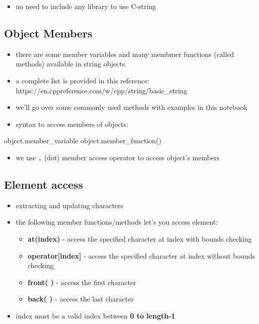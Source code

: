 \documentclass[11pt]{article}
\providecommand{\tightlist}{%
      \setlength{\itemsep}{0pt}\setlength{\parskip}{0pt}}
\newenvironment{Shaded}{}{}
\newcommand{\NormalTok}[1]{{#1}}
\newcommand{\OperatorTok}[1]{\textcolor[rgb]{0.40,0.40,0.40}{{#1}}}
\begin{document}
\begin{itemize}
\tightlist
\item
  no need to include any library to use C-string
\end{itemize}

    \hypertarget{object-members}{%
\subsection{Object Members}\label{object-members}}

\begin{itemize}
\tightlist
\item
  there are some member variables and many membmer functions (called
  methods) available in string objects
\item
  a complete list is provided in this reference:
  https://en.cppreference.com/w/cpp/string/basic\_string
\item
  we'll go over some commonly used methods with examples in this
  notebook
\item
  syntax to access members of objects:
\end{itemize}

\begin{Shaded}
\begin{Highlighting}[]
\NormalTok{    object}\OperatorTok{.}\NormalTok{member\_variable}
\NormalTok{    object}\OperatorTok{.}\NormalTok{member\_function}\OperatorTok{()}
\end{Highlighting}
\end{Shaded}

\begin{itemize}
\tightlist
\item
  we use \texttt{.} (dot) member access operator to access object's
  members
\end{itemize}

    \hypertarget{element-access}{%
\subsection{Element access}\label{element-access}}

\begin{itemize}
\tightlist
\item
  extracting and updating characters
\item
  the following member functions/methods let's you access element:

  \begin{itemize}
  \tightlist
  \item
    \textbf{at(index)} - access the specified character at index with
    bounds checking
  \item
    \textbf{operator{[}index{]}} - access the specified character at
    index without bounds checking
  \item
    \textbf{front( )} - access the first character
  \item
    \textbf{back( )} - access the last character
  \end{itemize}
\item
  index must be a valid index between \textbf{0 to length-1}
\end{itemize}
\end{document}
